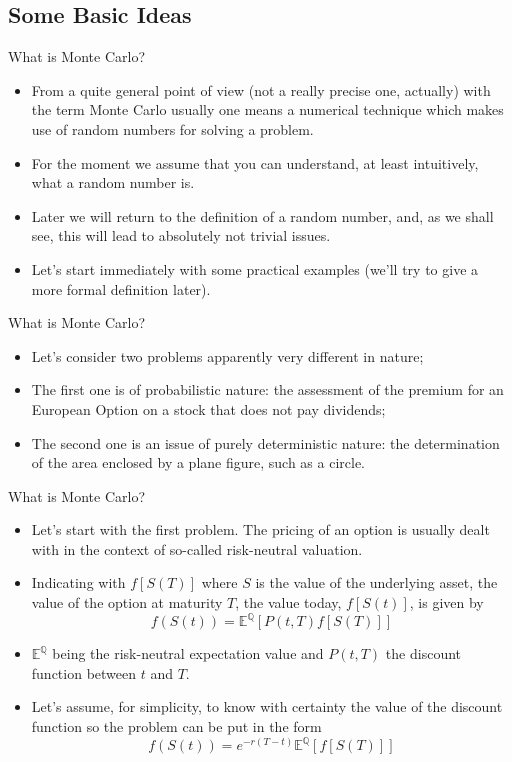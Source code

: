 \documentclass[11pt]{beamer}
\begin{document}
\subsection{Some Basic Ideas}
\begin{frame}{What is Monte Carlo?}
\begin{itemize}
\item From a quite general point of view (not a really precise one, actually)  with the term Monte Carlo usually one means a numerical technique which makes use of random numbers for solving a problem. 
\item For the moment we assume that you can understand, at least intuitively, what a random number is. 
\item Later we will return to the definition of a random number, and, as we shall see, this will lead to absolutely not trivial issues. 
\item Let's start  immediately with some practical examples (we'll try to give a more formal definition later). 
\end{itemize}
\end{frame}
\begin{frame}{What is Monte Carlo?}
\begin{itemize}
\item Let's consider two problems apparently very different in nature;
\item The first one is of probabilistic nature: the assessment of the premium for an European Option on a stock that does not pay dividends;
\item The second one is an issue of purely deterministic nature: the determination of the area enclosed by a plane figure, such as a circle. 
\end{itemize}
\end{frame}
\begin{frame}{What is Monte Carlo?}
\begin{itemize}
\item Let's start with the first problem. The pricing of an option is usually dealt with in the context of so-called risk-neutral valuation. 
\item Indicating with $f[S(T)]$ where $S$ is the value of the underlying asset, the value of the option at maturity $T$, the value today, $f[S(t)]$, is given by
$$f(S(t)) = \mathbb{E^Q} \left[ P(t,T) f[S(T)] \right]$$
\item $\mathbb{E^Q}$ being the risk-neutral expectation value and $P(t,T)$ the discount function between $t$ and $T$.  
\item Let's assume, for simplicity, to know with certainty the value of the discount function so the problem can be put in the form
$$f(S(t)) = e^{-r(T-t)} \mathbb{E^Q} \left[ f[S(T)] \right]$$
\end{itemize}
\end{frame}
\end{document}
